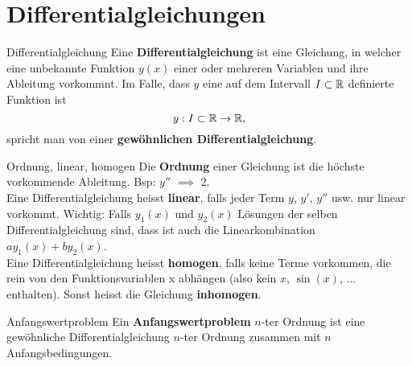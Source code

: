 \section{Differentialgleichungen}

\begin{Definition}{Differentialgleichung}{}
    Eine \textbf{Differentialgleichung} ist eine Gleichung, in welcher eine unbekannte Funktion $y(x)$ einer oder mehreren Variablen und ihre Ableitung vorkommnt. Im Falle, dass $y$ eine auf dem Intervall $I \subset \mathbb{R}$ definierte Funktion ist \[y: I \subset \mathbb{R} \to \mathbb{R},\] spricht man von einer \textbf{gewöhnlichen Differentialgleichung}.
\end{Definition}

\begin{Definition}{Ordnung, linear, homogen}{}
    Die \textbf{Ordnung} einer Gleichung ist die höchste vorkommende Ableitung. Bsp: $y''$ $\implies$ 2.\\
    
    Eine Differentialgleichung heisst \textbf{linear}, falls jeder Term $y$, $y'$, $y''$ usw. nur linear vorkommt. Wichtig: Falls $y_1(x)$ und $y_2(x)$ Lösungen der selben Differentialgleichung sind, dass ist auch die Linearkombination $ay_1(x) + by_2(x)$.\\
    
    Eine Differentialgleichung heisst \textbf{homogen}, falls keine Terme vorkommen, die rein von den Funktionsvariablen x abhängen (also kein $x$, $\sin(x)$, ... enthalten). Sonst heisst die Gleichung \textbf{inhomogen}.
\end{Definition}

\begin{Definition}{Anfangswertproblem}{}
    Ein \textbf{Anfangswertproblem} $n$-ter Ordnung ist eine gewöhnliche Differentialgleichung $n$-ter Ordnung zusammen mit $n$ Anfangsbedingungen.
\end{Definition}


